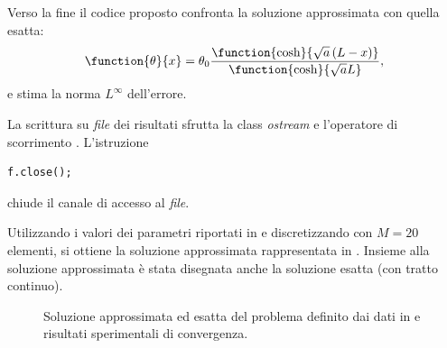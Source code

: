 Verso la fine il codice proposto confronta la soluzione approssimata
con quella esatta:
\begin{equation*}
\function{\theta}{x} = \theta_0\frac{\function{\cosh}{\sqrt{a}\left(L - x\right)}}{\function{\cosh}{\sqrt{a}L}},
\end{equation*} e stima la norma $L^\infty$ dell'errore.

La scrittura su \emph{file} dei risultati sfrutta la class
\emph{ostream} e l'operatore di scorrimento \cpp{<<}.
L'istruzione
\lstset{basicstyle=\scriptsize\sf}
\begin{lstlisting}
f.close();
\end{lstlisting}
\lstset{basicstyle=\sf}
chiude il canale di accesso al \emph{file}. 

Utilizzando i valori dei parametri riportati in  e 
discretizzando con $M=20$ elementi, si ottiene la soluzione approssimata
rappresentata in . Insieme alla soluzione approssimata
\`e stata disegnata anche la soluzione esatta (con tratto continuo).
%
\begin{figure}
\caption{Soluzione approssimata ed esatta del problema definito dai
dati in  e risultati sperimentali di convergenza.}
\label{fig:fin:results}
\end{figure}

